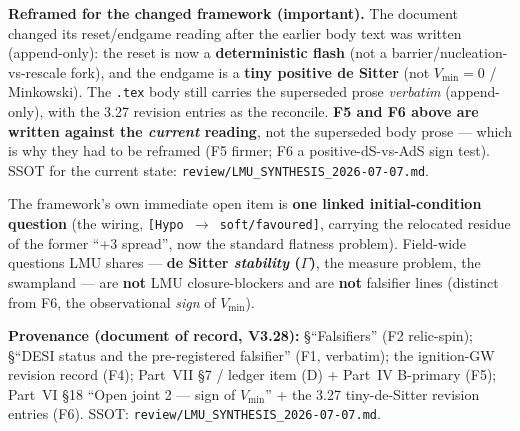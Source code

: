 \documentclass[11pt,a4paper]{article}
\newcommand{\st}[1]{\texttt{[#1]}}
\begin{document}
\textbf{Reframed for the changed framework (important).} The document changed its reset/endgame reading after the earlier body text was written (append-only): the reset is now a \textbf{deterministic flash} (not a barrier/nucleation-vs-rescale fork), and the endgame is a \textbf{tiny positive de Sitter} (not $V_{\min}=0$ / Minkowski). The \texttt{.tex} body still carries the superseded prose \emph{verbatim} (append-only), with the 3.27 revision entries as the reconcile. \textbf{F5 and F6 above are written against the \emph{current} reading}, not the superseded body prose --- which is why they had to be reframed (F5 firmer; F6 a positive-dS-vs-AdS sign test). SSOT for the current state: \texttt{review/LMU\_SYNTHESIS\_2026-07-07.md}.

The framework's own immediate open item is \textbf{one linked initial-condition question} (the wiring, \st{Hypo $\to$ soft/favoured}, carrying the relocated residue of the former ``+3 spread'', now the standard flatness problem). Field-wide questions LMU shares --- \textbf{de Sitter \emph{stability} ($\Gamma$)}, the measure problem, the swampland --- are \textbf{not} LMU closure-blockers and are \textbf{not} falsifier lines (distinct from F6, the observational \emph{sign} of $V_{\min}$).

\textbf{Provenance (document of record, V3.28):} \S``Falsifiers'' (F2 relic-spin); \S``DESI status and the pre-registered falsifier'' (F1, verbatim); the ignition-GW revision record (F4); Part~VII \S7 / ledger item (D) + Part~IV B-primary (F5); Part~VI \S18 ``Open joint 2 --- sign of $V_{\min}$'' + the 3.27 tiny-de-Sitter revision entries (F6). SSOT: \texttt{review/LMU\_SYNTHESIS\_2026-07-07.md}.
\end{document}
